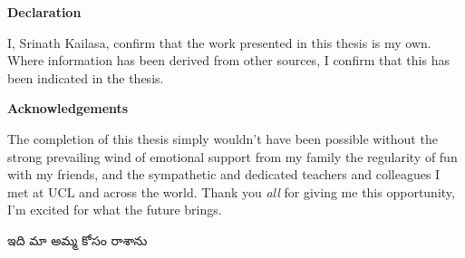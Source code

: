 \thispagestyle{plain}

\begin{center}
    \textbf{Declaration}
\end{center}
I, Srinath Kailasa, confirm that the work presented in this thesis is my own. Where information has been derived from other sources, I confirm that this has been indicated in the thesis.


\begin{center}
    \textbf{Acknowledgements}
\end{center}

The completion of this thesis simply wouldn't have been possible without the strong prevailing wind of emotional support from my family the regularity of fun with my friends, and the sympathetic and dedicated teachers and colleagues I met at UCL and across the world. Thank you \textit{all} for giving me this opportunity, I'm excited for what the future brings.

\begin{center}
   {\tel ఇది మా అమ్మ కోసం రాశాను}
\end{center}